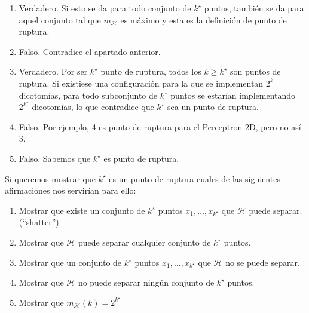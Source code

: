 \documentclass[11pt,leqno]{article}
\theoremstyle{definition}
\begin{document}
\begin{solucion} \textbf{ }
\begin{enumerate}[a]
\item  Verdadero. Si esto se da para todo conjunto de $k^\star$ puntos, también se da para aquel conjunto tal que $m_\mathcal{H}$ es máximo y esta es la definición de punto de ruptura.
\item  Falso. Contradice el apartado anterior.
\item  Verdadero. Por ser $k^\star$ punto de ruptura, todos los $k \geq k^\star$ son puntos de ruptura. Si existiese una configuración para la que se implementan $2^k$ dicotomías, para todo subconjunto de $k^\star$ puntos se estarían implementando $2^{k^\star}$ dicotomías, lo que contradice que $k^\star$ sea un punto de ruptura.
\item  Falso. Por ejemplo, 4 es punto de ruptura para el Perceptron 2D, pero no así 3.
\item  Falso. Sabemos que $k^\star$ es punto de ruptura.
\end{enumerate}
\end{solucion}

\begin{cuestion}
Si queremos mostrar que $k^\star$ es un punto de ruptura cuales de las siguientes afirmaciones nos servirían para ello:

\begin{enumerate}[a]
\item Mostrar que existe un conjunto de $k^\star$ puntos $x_1,  \dots, x_{k^\star}$ que $\mathcal{H}$ puede separar. (``shatter'')
\item Mostrar que  $\mathcal{H}$ puede separar cualquier conjunto de $k^\star$ puntos.
\item Mostrar que un conjunto de $k^\star$ puntos $x_1,  \dots, x_{k^\star}$ que $\mathcal{H}$ no se puede separar.
\item Mostrar que $\mathcal{H}$ no puede separar ningún conjunto de $k^\star$ puntos.
\item Mostrar que $m_{\mathcal{H}}(k)=2^{k^\star}$
\end{enumerate}
\end{cuestion}
\end{document}
